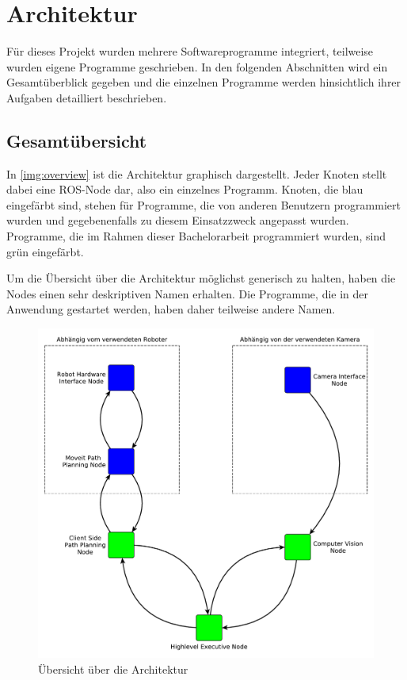 \chapter{Architektur}
\label{chap:architektur}
Für dieses Projekt wurden mehrere Softwareprogramme integriert, teilweise wurden eigene Programme geschrieben. In den folgenden Abschnitten wird ein Gesamtüberblick gegeben und die einzelnen Programme werden hinsichtlich ihrer Aufgaben detailliert beschrieben.

\section{Gesamtübersicht} %
\label{sec:gesamtübersicht}
In \autoref{img:overview} ist die Architektur graphisch dargestellt. Jeder Knoten stellt dabei eine ROS-Node dar, also ein einzelnes Programm. Knoten, die blau eingefärbt sind, stehen für Programme, die von anderen Benutzern programmiert wurden und gegebenenfalls zu diesem Einsatzzweck angepasst wurden. Programme, die im Rahmen dieser Bachelorarbeit programmiert wurden, sind grün eingefärbt.

Um die Übersicht über die Architektur möglichst generisch zu halten, haben die Nodes einen sehr deskriptiven Namen erhalten. Die Programme, die in der Anwendung gestartet werden, haben daher teilweise andere Namen.
\begin{figure}[!hbt]
	\centering
	\vspace{1ex}
	\includegraphics[scale=0.6]{../images/overview}
	\caption[Übersicht über die Architektur. Die Pfeile verdeutlichen die Kommunikation zwischen den Knoten.]{\label{img:overview} Übersicht über die Architektur}
	\vspace{1ex}
\end{figure}

